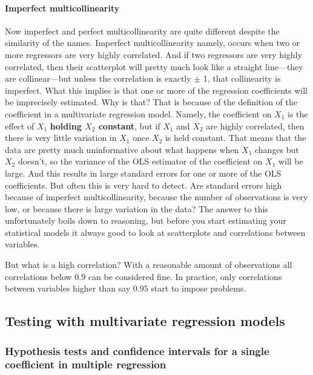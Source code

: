 \documentclass[
]{book}
\begin{document}
\hypertarget{imperfect-multicollinearity}{%
\paragraph{Imperfect multicollinearity}\label{imperfect-multicollinearity}}

Now imperfect and perfect multicollinearity are quite different despite the similarity of the names. Imperfect multicollinearity namely, occurs when two or more regressors are very highly correlated. And if two regressors are very highly correlated, then their scatterplot will pretty much look like a straight line---they are collinear---but unless the correlation is exactly \(\pm\) 1, that collinearity is imperfect. What this implies is that one or more of the regression coefficients will be imprecisely estimated. Why is that? That is because of the definition of the coefficient in a multivariate regression model. Namely, the coefficient on \(X_1\) is the effect of \(X_1\) \textbf{holding \(X_2\) constant}, but if \(X_1\) and \(X_2\) are highly correlated, then there is very little variation in \(X_1\) once \(X_2\) is held constant. That means that the data are pretty much uninformative about what happens when \(X_1\) changes but \(X_2\) doesn't, so the variance of the OLS estimator of the coefficient on \(X_1\) will be large. And this results in large standard errors for one or more of the OLS coefficients. But often this is very hard to detect. Are standard errors high because of imperfect multicollinearity, because the number of observations is very low, or because there is large variation in the data? The answer to this unfortunately boils down to reasoning, but before you start estimating your statistical models it always good to look at scatterplots and correlations between variables.

But what is a high correlation? With a reasonable amount of observations all correlations below \(0.9\) can be considered fine. In practice, only correlations between variables higher than say \(0.95\) start to impose problems.

\hypertarget{testing-with-multivariate-regression-models}{%
\subsection{Testing with multivariate regression models}\label{testing-with-multivariate-regression-models}}

\hypertarget{hypothesis-tests-and-confidence-intervals-for-a-single-coefficient-in-multiple-regression}{%
\subsubsection{Hypothesis tests and confidence intervals for a single coefficient in multiple regression}\label{hypothesis-tests-and-confidence-intervals-for-a-single-coefficient-in-multiple-regression}}
\end{document}
